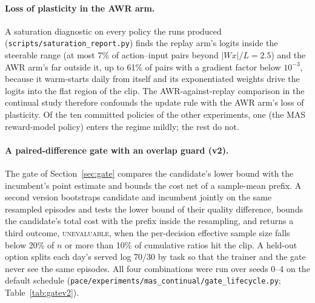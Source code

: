 \documentclass[10pt]{article}
\newcommand{\code}[1]{\texttt{#1}}
\begin{document}
\paragraph{Loss of plasticity in the AWR arm.} A saturation diagnostic on every policy the runs produced (\code{scripts/saturation\_report.py}) finds the replay arm's logits inside the steerable range (at most 7\% of action--input pairs beyond $|Wx|/L=2.5$) and the AWR arm's far outside it, up to 61\% of pairs with a gradient factor below $10^{-3}$, because it warm-starts daily from itself and its exponentiated weights drive the logits into the flat region of the clip. The AWR-against-replay comparison in the continual study therefore confounds the update rule with the AWR arm's loss of plasticity. Of the ten committed policies of the other experiments, one (the MAS reward-model policy) enters the regime mildly; the rest do not.

\paragraph{A paired-difference gate with an overlap guard (v2).} The gate of Section~\ref{sec:gate} compares the candidate's lower bound with the incumbent's point estimate and bounds the cost net of a sample-mean prefix. A second version bootstraps candidate and incumbent jointly on the same resampled episodes and tests the lower bound of their quality difference, bounds the candidate's total cost with the prefix inside the resampling, and returns a third outcome, \textsc{unevaluable}, when the per-decision effective sample size falls below 20\% of $n$ or more than 10\% of cumulative ratios hit the clip. A held-out option splits each day's served log 70/30 by task so that the trainer and the gate never see the same episodes. All four combinations were run over seeds 0--4 on the default schedule (\code{pace/experiments/mas\_continual/gate\_lifecycle.py}; Table~\ref{tab:gatev2}).
\end{document}
